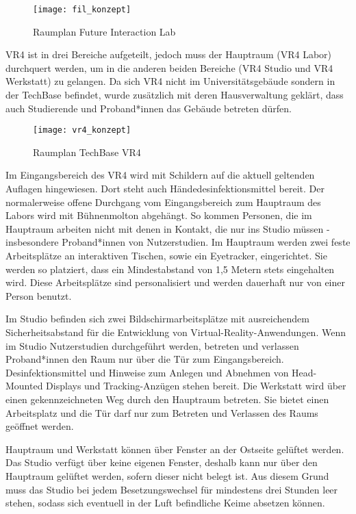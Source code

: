 \medskip
\begin{figure}[h]
    \label{fig:raumplan_fil}
    \centering
    \texttt{[image: fil\_konzept]}
    \caption{Raumplan Future Interaction Lab}
\end{figure}

\noindent
VR4 ist in drei Bereiche aufgeteilt, jedoch muss der Hauptraum (VR4 Labor) durchquert werden, um in die anderen beiden Bereiche (VR4 Studio und VR4 Werkstatt) zu gelangen. Da sich VR4 nicht im Universitätsgebäude sondern in der TechBase befindet, wurde zusätzlich mit deren Hausverwaltung geklärt, dass auch Studierende und Proband*innen das Gebäude betreten dürfen.

\medskip
\begin{figure}[h]
    \label{fig:raumplan_vr4}
    \centering
    \texttt{[image: vr4\_konzept]}
    \caption{Raumplan TechBase VR4}
\end{figure}

Im Eingangsbereich des VR4 wird mit Schildern auf die aktuell geltenden Auflagen hingewiesen.
Dort steht auch Händedesinfektionsmittel bereit. Der normalerweise offene Durchgang vom Eingangsbereich zum Hauptraum des Labors wird mit Bühnenmolton abgehängt. So kommen Personen, die im Hauptraum arbeiten nicht mit denen in Kontakt, die nur ins Studio müssen - insbesondere Proband*innen von Nutzerstudien. Im Hauptraum werden zwei feste Arbeitsplätze an interaktiven Tischen, sowie ein Eyetracker, eingerichtet. Sie werden so platziert, dass ein Mindestabstand von 1,5 Metern stets eingehalten wird.
Diese Arbeitsplätze sind personalisiert und werden dauerhaft nur von einer Person benutzt.

Im Studio befinden sich zwei Bildschirmarbeitsplätze mit ausreichendem Sicherheitsabstand für die Entwicklung von Virtual-Reality-Anwendungen. Wenn im Studio Nutzerstudien durchgeführt werden, betreten und verlassen Proband*innen den Raum nur über die Tür zum Eingangsbereich. Desinfektionsmittel und Hinweise zum Anlegen und Abnehmen von Head-Mounted Displays und Tracking-Anzügen stehen bereit.
Die Werkstatt wird über einen gekennzeichneten Weg durch den Hauptraum betreten. Sie bietet einen Arbeitsplatz und die Tür darf nur zum Betreten und Verlassen des Raums geöffnet werden.

Hauptraum und Werkstatt können über Fenster an der Ostseite gelüftet werden.
Das Studio verfügt über keine eigenen Fenster, deshalb kann nur über den Hauptraum gelüftet werden, sofern dieser nicht belegt ist.
Aus diesem Grund muss das Studio bei jedem Besetzungswechsel für mindestens drei Stunden leer stehen, sodass sich eventuell in der Luft befindliche Keime absetzen können.

